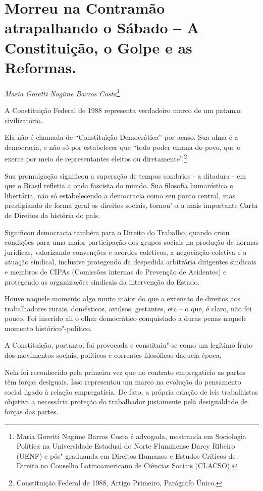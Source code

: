 \chapter{Morreu na Contramão atrapalhando o Sábado -- A Constituição, o
Golpe e as Reformas.}

\begin{flushright}
\emph{Maria Goretti Nagime Barros Costa}\footnote{Maria Goretti
Nagime Barros Costa é advogada, mestranda em
Sociologia Política na Universidade Estadual do Norte Fluminense Darcy
Ribeiro (UENF) e pós"-graduanda em Direitos Humanos e Estudos Críticos de
Direito no Conselho Latinoamericano de Ciências Sociais (CLACSO).}
\end{flushright}

A Constituição Federal de 1988 representa verdadeiro marco de um patamar
civilizatório.

Ela não é chamada de ``Constituição Democrática'' por acaso. Sua alma é
a democracia, e não só por estabelecer que ``todo poder emana do povo,
que o exerce por meio de representantes eleitos ou
diretamente''.\footnote{Constituição Federal de 1988, Artigo Primeiro,
  Parágrafo Único.}

Sua promulgação significou a superação de tempos sombrios - a ditadura -
em que o Brasil refletia a onda fascista do mundo. Sua filosofia
humanística e libertária, não só estabelecendo a democracia como seu
ponto central, mas prestigiando de forma geral os direitos sociais,
tornou"-a a mais importante Carta de Direitos da história do país.

Significou democracia também para o Direito do Trabalho, quando criou
condições para uma maior participação dos grupos sociais na produção de
normas jurídicas, valorizando convenções e acordos coletivos, a
negociação coletiva e a atuação sindical, inclusive protegendo da
despedida arbitrária dirigentes sindicais e membros de CIPAs (Comissões
internas de Prevenção de Acidentes) e protegendo as organizações
sindicais da intervenção do Estado.

Houve naquele momento algo muito maior do que a extensão de direitos aos
trabalhadores rurais, domésticos, avulsos, gestantes, etc -- o que, é
claro, não foi pouco. Foi inserido ali o olhar democrático conquistado a
duras penas naquele momento histórico"-político.

A Constituição, portanto, foi provocada e constituiu"-se como um legítimo
fruto dos movimentos sociais, políticos e correntes filosóficas daquela
época.

Nela foi reconhecido pela primeira vez que no contrato empregatício as
partes têm forças desiguais. Isso representou um marco na evolução do
pensamento social ligado à relação empregatícia. De fato, a própria
criação de leis trabalhistas objetiva a necessária proteção do
trabalhador justamente pela desigualdade de forças das partes.

